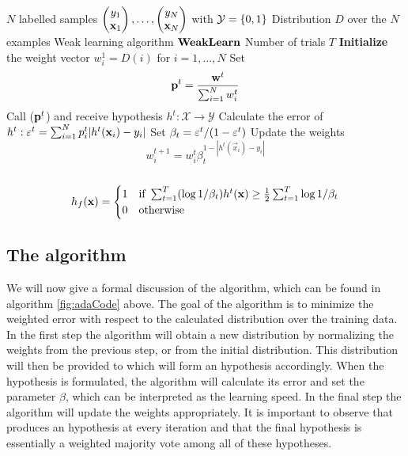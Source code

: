 \begin{algorithm} 
\caption{\adaB}
\label{fig:adaCode}
	\begin{algorithmic}[1]
	\Require 
	\Statex $N$ labelled samples $\Vec{y_1\\ \mathbf x_1},\ldots,\Vec{y_N\\ \mathbf x_N}$  with $\mathcal Y = \set{0,1}$ 
	\Statex Distribution $D$ over the $N$ examples
	\Statex Weak learning algorithm $\weak$
	\Statex Number of trials $T$
	\State \textbf{Initialize} the weight vector $w_i^1=D(i)$ for $i=1,\ldots,N$
	\State Set $$\bf p^t= \frac{\bf w^t}{\sum_{i=1}^N w^t_i}$$
	\State Call \weak($\bf p^t$) and receive hypothesis $h^t:\mathcal X\to\mathcal Y$
	\State Calculate the error of $h^t:\ve^t=\sum^N_{i=1}p^t_i|h^t(\mathbf x_i)-y_i|$\label{algStep:adaErr}
	\State Set $\b_t=\ve^t/(1-\ve^t)$
	\State Update the weights $$w_i^{t+1}=w_i^t\beta^{1-|h^t(\vec x_i)-y_i|}_t$$
	\EndFor\\
	\Return $$h_f(\mathbf x)=\begin{cases}1 & \text{if } \sum^T_{t=1}(\log1/\b_t)h^t(\mathbf x)\geq\frac12\sum^T_{t=1}\log1/\b_t\\0&\text{otherwise}\end{cases}$$
	\EndProcedure
	\end{algorithmic}
\end{algorithm}
\vspace{-5pt}
\subsection{The algorithm}
\label{subsec:AdaAlgo}
We will now give a formal discussion of the \adaB\cite{Freund1997} algorithm, which can be found in algorithm \ref{fig:adaCode} above. The goal of the algorithm is to minimize the weighted error with respect to the calculated distribution 
over the training data. In the first step the algorithm will obtain a new distribution by normalizing the weights from the previous step, or from the initial distribution. This distribution will then be provided to \weak which will form an hypothesis accordingly. When the hypothesis is formulated, the algorithm will calculate its error and set the parameter $\beta$, which can be interpreted as the learning speed. In the final step the algorithm will update the weights appropriately. It is important to observe that \weak produces an hypothesis at every iteration and that the final hypothesis is essentially a weighted majority vote among all of these hypotheses. \par

